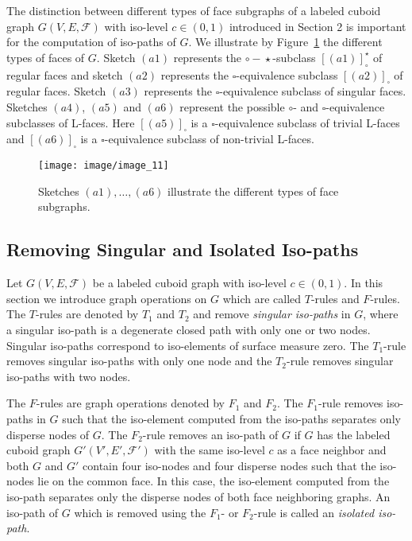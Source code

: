 \documentclass[a4paper,11pt]{article}
\begin{document}
The distinction between different types of face subgraphs of a labeled cuboid graph $G(V,E,\mathcal{F})$
with iso-level $c\in (0,1)$ introduced in Section 2 is important
for the computation of iso-paths of $G$. We illustrate by Figure~\ref{image_11} the different types
of faces of $G$. Sketch $(a1)$ represents the $\circ\!-\!\star$-subclass $[(a1)]_{\circ}^{\star}$ of
regular faces and sketch $(a2)$ represents the $\square$-equivalence subclass $[(a2)]_{\square}$
of regular faces. Sketch $(a3)$ represents the $\square$-equivalence subclass of singular faces.
Sketches $(a4)$, $(a5)$ and $(a6)$ represent the possible $\circ$- and $\square$-equivalence
subclasses of L-faces. Here $[(a5)]_{\square}$ is a $\square$-equivalence subclass of trivial L-faces
and $[(a6)]_{\square}$ is a $\square$-equivalence subclass of non-trivial L-faces.
\begin{figure}[!ht]
\texttt{[image: image/image\_11]}
\caption{Sketches $(a1),\ldots,(a6)$ illustrate the different types of face subgraphs.}
\label{image_11}
\end{figure}
\FloatBarrier


\subsection{Removing Singular and Isolated Iso-paths}
Let $G(V,E,\mathcal{F})$ be a labeled cuboid graph with iso-level $c\in (0,1)$. In this section
we introduce graph operations on $G$ which are called $T$-rules and $F$-rules.
The $T$-rules are denoted by $T_1$ and $T_2$ and remove {\it singular iso-paths} in $G$, where
a singular iso-path is a degenerate closed path with only one or two nodes. Singular
iso-paths correspond to iso-elements of surface measure zero. The $T_1$-rule removes singular
iso-paths with only one node and the $T_2$-rule removes singular iso-paths with two nodes.

The $F$-rules are graph operations denoted by $F_1$ and $F_2$. The $F_1$-rule removes
iso-paths in $G$ such that the iso-element computed from the iso-paths separates only
disperse nodes of $G$. The $F_2$-rule removes an iso-path of $G$ if $G$ has the
labeled cuboid graph $G'(V',E',\mathcal{F}')$ with the same iso-level $c$
as a face neighbor and both $G$ and $G'$ contain four iso-nodes and four disperse
nodes such that the iso-nodes lie on the common face. In this case, the
iso-element computed from the iso-path separates only the disperse nodes of both
face neighboring graphs. An iso-path of $G$ which is removed using the $F_1$- or $F_2$-rule is
called an {\it isolated iso-path}.\\
\end{document}
